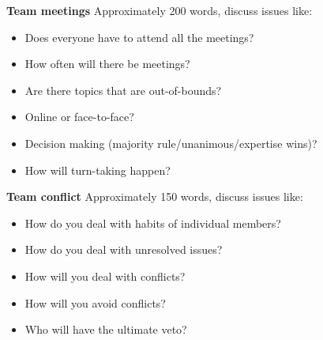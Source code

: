 \documentclass[a4paper,12pt]{article}
\begin{document}
\vspace{0.4cm}
\textbf{Team meetings}
\vspace{0.2cm}
Approximately 200 words, discuss issues like:
\begin{itemize}
    \item Does everyone have to attend all the meetings?
    \item How often will there be meetings? 
    \item Are there topics that are out-of-bounds?
    \item Online or face-to-face?
    \item Decision making (majority rule/unanimous/expertise wins)?
    \item How will turn-taking happen?
\end{itemize}

\vspace{1cm}
\textbf{Team conflict}
\vspace{0.2cm}
Approximately 150 words, discuss issues like:
\begin{itemize}
    \item How do you deal with habits of individual members?
    \item How do you deal with unresolved issues? 
    \item How will you deal with conflicts?
    \item How will you avoid conflicts?
    \item Who will have the ultimate veto? 
\end{itemize}
\end{document}
